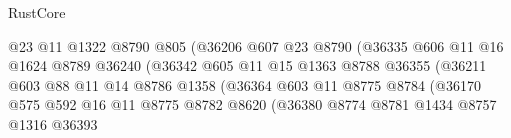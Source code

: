 \begin{lexlean}{RustCore}
\begin{coremodule}
                                        @23
                                        @11
                                        @1322
                                        @8790
                                        @805
                                        (@36206
                                          @607
                                          @23
                                          @8790
                                          (@36335
                                            @606
                                            @11
                                            @16
                                            @1624
                                            @8789
                                            @36240
                                            (@36342
                                              @605
                                              @11
                                              @15
                                              @1363
                                              @8788
                                              @36355
                                              (@36211
                                                @603
                                                @88
                                                @11
                                                @14
                                                @8786
                                                @1358
                                                (@36364
                                                  @603
                                                  @11
                                                  @8775
                                                  @8784
                                                  (@36170
                                                    @575
                                                    @592
                                                    @16
                                                    @11
                                                    @8775
                                                    @8782
                                                    @8620
                                                    (@36380
                                                      @8774
                                                      @8781
                                                      @1434
                                                      @8757
                                                      @1316
                                                      @36393

\end{coremodule}
\end{lexlean}
